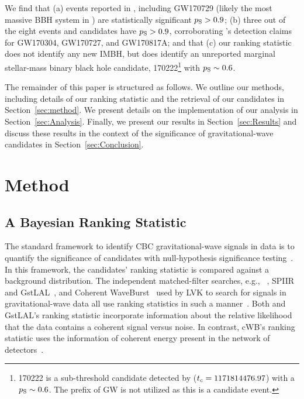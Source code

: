\documentclass[
 nofootinbib,
 amsmath,amssymb,
 aps,
 twocolumn,
 superscriptaddress
]{revtex4-2}
\newcommand{\gstlal}{{\sc GstLAL}\xspace}
\newcommand{\cwb}{{\sc cWB}\xspace}
\newcommand{\spiir}{{\sc SPIIR}\xspace}
\newcommand{\pycbc}{{\sc {{PyCBC}}}\xspace}
\newcommand{\GWTC}{{\sc {{GWTC-1}}}\xspace}
\newcommand{\IAS}{{\sc {{IAS}}}\xspace}
\newcommand{\fancytext}[1]{{\relax\ifmmode#1\else $#1$\fi}\xspace}
\newcommand{\pastrobcr}{\fancytext{p_\text{S}}}
\newcommand{\tc}{\fancytext{t_c}}
\begin{document}
We find that (a) events reported in \GWTC, including GW170729 (likely the most massive BBH system in \GWTC) are statistically significant ${\pastrobcr>0.9}$; (b) three out of the eight \IAS events and candidates have ${\pastrobcr>0.9}$, corroborating \IAS's detection claims for GW170304, GW170727, and GW170817A; and that (c) our ranking statistic does not identify any new IMBH, but does identify an unreported marginal stellar-mass binary black hole candidate, 170222\footnote{170222 is a sub-threshold candidate detected by \pycbc (${\tc = 1171814476.97}$) with a ${\pastrobcr\sim0.6}$. The prefix of GW is not utilized as this is a candidate event.} with ${\pastrobcr\sim0.6}$. 

The remainder of this paper is structured as follows. We outline our methods, including details of our ranking statistic and the retrieval of our candidates in Section~\ref{sec:method}. We present details on the implementation of our analysis in Section~\ref{sec:Analysis}. Finally, we present our results in Section~\ref{sec:Results} and discuss these results in the context of the significance of gravitational-wave candidates in Section~\ref{sec:Conclusion}.

\section{Method\label{sec:method}}
\subsection{A Bayesian Ranking Statistic}
The standard framework to identify CBC gravitational-wave signals in data is to quantify the significance of candidates with null-hypothesis significance testing~\cite{GWTC1, GWTC2}. In this framework, the candidates' ranking statistic is compared against a background distribution. The independent matched-filter searches, e.g., \pycbc~\cite{pycbc_og4}, \spiir~\cite{spiir} and \gstlal~\cite{sachdev2019gstlal}, and Coherent WaveBurst~\cite{cwb} used by LVK to search for signals in gravitational-wave data all use ranking statistics in such a manner~\cite{GWTC1}. Both \pycbc and \gstlal's ranking statistic incorporate information about the relative likelihood that the data contains a coherent signal versus noise. In contrast, \cwb's ranking statistic uses the information of coherent energy present in the network of detectors~\cite{GWTC1}. 
\end{document}
